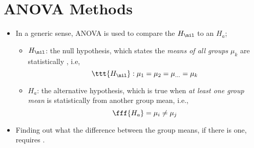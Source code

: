 \section{ANOVA Methods}
\begin{itemize}
  \item In a generic sense, ANOVA is used to compare the \(H_\nil\) to an \(H_a\);
    \begin{itemize}
      \item \(H_\nil\): the null hypothesis, which states the \emph{means of all groups} \(\mu_k\) are statistically , i.e,
      \[%
      \ttt{H_\nil} : \mu_1 = \mu_2 = \mu_{\ldots} = \mu_k
      \]%
      \item \(H_a\): the alternative hypothesis, which is true when \emph{at least one group mean} is statistically  from another group mean, i.e.,
      \[%
      \fff{H_a} = \mu_i \neq \mu_j
      \]%
    \end{itemize}
  \item Finding out what the difference between the group means, if there is one, requires \hyperref[Subsection: Post-Hoc Comparisons]{}.


\end{itemize}
